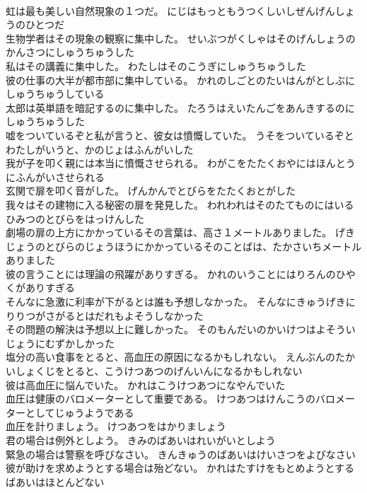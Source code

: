 \documentclass[8pt]{extreport}
\begin{document}
\begin{CJK}{UTF8}{min}
\\	虹は最も美しい自然現象の１つだ。	にじはもっともうつくしいしぜんげんしょうのひとつだ 
\\	生物学者はその現象の観察に集中した。	せいぶつがくしゃはそのげんしょうのかんさつにしゅうちゅうした 
\\	私はその講義に集中した。	わたしはそのこうぎにしゅうちゅうした 
\\	彼の仕事の大半が都市部に集中している。	かれのしごとのたいはんがとしぶにしゅうちゅうしている 
\\	太郎は英単語を暗記するのに集中した。	たろうはえいたんごをあんきするのにしゅうちゅうした 
\\	嘘をついているぞと私が言うと、彼女は憤慨していた。	うそをついているぞとわたしがいうと、かのじょはふんがいした 
\\	我が子を叩く親には本当に憤慨させられる。	わがこをたたくおやにはほんとうにふんがいさせられる 
\\	玄関で扉を叩く音がした。	げんかんでとびらをたたくおとがした 
\\	我々はその建物に入る秘密の扉を発見した。	われわれはそのたてものにはいるひみつのとびらをはっけんした 
\\	劇場の扉の上方にかかっているその言葉は、高さ１メートルありました。	げきじょうのとびらのじょうほうにかかっているそのことばは、たかさいちメートルありました 
\\	彼の言うことには理論の飛躍がありすぎる。	かれのいうことにはりろんのひやくがありすぎる 
\\	そんなに急激に利率が下がるとは誰も予想しなかった。	そんなにきゅうげきにりりつがさがるとはだれもよそうしなかった 
\\	その問題の解決は予想以上に難しかった。	そのもんだいのかいけつはよそういじょうにむずかしかった 
\\	塩分の高い食事をとると、高血圧の原因になるかもしれない。	えんぶんのたかいしょくじをとると、こうけつあつのげんいんになるかもしれない 
\\	彼は高血圧に悩んでいた。	かれはこうけつあつになやんでいた 
\\	血圧は健康のバロメーターとして重要である。	けつあつはけんこうのバロメーターとしてじゅうようである 
\\	血圧を計りましょう。	けつあつをはかりましょう 
\\	君の場合は例外としよう。	きみのばあいはれいがいとしよう 
\\	緊急の場合は警察を呼びなさい。	きんきゅうのばあいはけいさつをよびなさい 
\\	彼が助けを求めようとする場合は殆どない。	かれはたすけをもとめようとするばあいはほとんどない 

\end{CJK}
\end{document}
